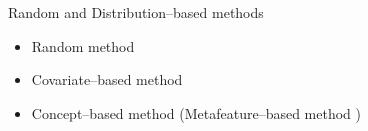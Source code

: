 \begin{frame}{Random and Distribution–based methods}
    \begin{itemize}
        \item Random method
        \item Covariate–based method
        \item Concept–based method (Metafeature–based method \cite{deeva2023evaluating})
    \end{itemize}
\end{frame}